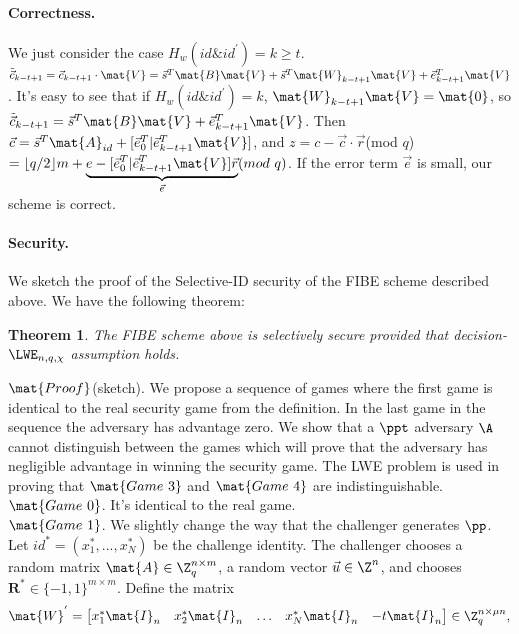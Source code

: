 \documentclass[11pt,hidelinks]{article}
\newtheorem{theorem}{Theorem}[section]
\begin{document}
\begin{appendix}
\paragraph{Correctness.} We just consider the case $H_{w}(id \& id^{'})=k\geq t$. $\tilde{\vec{c}}_{k-t+1}=\vec{c}_{k-t+1}\cdot \mat{V}=\vec{s}^{T}\mat{B}\mat{V}+\vec{s}^{T}\mat{W}_{k-t+1}\mat{V}+\vec{e}^{T}_{k-t+1}\mat{V}$. It's easy to see that if $H_{w}(id \& id^{'})=k$, $\mat{W}_{k-t+1}\mat{V}=\mat{0}$, so $\tilde{\vec{c}}_{k-t+1}=\vec{s}^{T}\mat{B}\mat{V}+\vec{e}^{T}_{k-t+1}\mat{V}$. Then $\vec{c}=\vec{s}^{T}\mat{A}_{id}+[\vec{e}^{T}_{0}|\vec{e}^{T}_{k-t+1}\mat{V}]$, and $z=c-\vec{c}\cdot \vec{r}$(mod $q$)$=\lfloor q/2 \rfloor m+\underbrace{e-[\vec{e}^{T}_{0}|\vec{e}^{T}_{k-t+1}\mat{V}]\vec{r}}_{\vec{e}}(mod\ q)$. If the error term $\vec{e}$ is small, our scheme is correct.
\paragraph{Security.} We sketch the proof of the Selective-ID security of the FIBE scheme described above. We have the following theorem:
\begin{theorem}
The FIBE scheme above is selectively secure provided that decision-$\LWE_{n,q,\chi}$ assumption holds.
\end{theorem}
\noindent $\mat{Proof}$(sketch). We propose a sequence of games where the first game is identical to the real security game from the definition. In the last game in the sequence the adversary has advantage zero. We show that a $\ppt$ adversary $\A$ cannot distinguish between the games which will prove that the adversary has negligible advantage in winning the security game. The LWE problem is used in proving that $\mat{Game\ 3}$ and $\mat{Game\ 4}$ are indistinguishable.\\[0.2cm]
$\mat{Game\ 0}$. It's identical to the real game.\\[0.2cm]
$\mat{Game\ 1}$. We slightly change the way that the challenger generates $\pp$. Let $id^{*}=(x^{*}_{1},...,x^{*}_{N})$ be the challenge identity. The challenger chooses a random matrix $\mat{A} \in \Z^{n \times m}_{q}$, a random vector $\vec{u} \in \Z^{n}$, and chooses $\textbf{R}^{*}\in \{-1,1\}^{m \times m}$. Define the matrix
\begin{equation}
\mat{W}^{'}= \begin{bmatrix}
x^{*}_{1} \mat{I}_{n}&x^{*}_{2} \mat{I}_{n}&\ldots&x^{*}_{N} \mat{I}_{n}&-t \mat{I}_{n}
\end{bmatrix} \in \Z^{n \times \mu n}_{q},

\end{equation}
\end{appendix}
\end{document}
